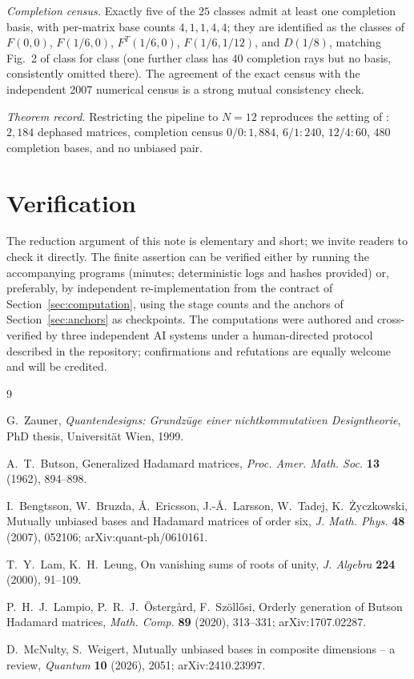 \documentclass[11pt]{article}
\theoremstyle{remark}
\begin{document}
\emph{Completion census.} Exactly five of the $25$ classes admit at
least one completion basis, with per-matrix base counts $4, 1, 1, 4,
4$; they are identified as the classes of $F(0,0)$, $F(1/6, 0)$,
$F^{T}(1/6, 0)$, $F(1/6, 1/12)$, and $D(1/8)$, matching Fig.~2 of
\cite{bengtsson2007} class for class (one further class has $40$
completion rays but no basis, consistently omitted there). The
agreement of the exact census with the independent 2007 numerical
census is a strong mutual consistency check.

\emph{Theorem record.} Restricting the pipeline to $N = 12$ reproduces
the setting of \cite[Thm.~7.15]{mcnulty2026}: $2{,}184$ dephased
matrices, completion census $0/0: 1{,}884$, $6/1: 240$, $12/4: 60$,
$480$ completion bases, and no unbiased pair.

\section{Verification}

The reduction argument of this note is elementary and short; we invite
readers to check it directly. The finite assertion can be verified
either by running the accompanying programs (minutes; deterministic
logs and hashes provided) or, preferably, by independent
re-implementation from the contract of Section~\ref{sec:computation},
using the stage counts and the anchors of Section~\ref{sec:anchors} as
checkpoints. The computations were authored and cross-verified by three
independent AI systems under a human-directed protocol described in the
repository; confirmations and refutations are equally welcome and will
be credited.

\begin{thebibliography}{9}

 G.~Zauner, \emph{Quantendesigns: Grundz\"uge
einer nichtkommutativen Designtheorie}, PhD thesis, Universit\"at Wien,
1999.

 A.~T.~Butson, Generalized Hadamard matrices,
\emph{Proc. Amer. Math. Soc.} \textbf{13} (1962), 894--898.

 I.~Bengtsson, W.~Bruzda, {\AA}.~Ericsson,
J.-{\AA}.~Larsson, W.~Tadej, K.~\.Zyczkowski, Mutually unbiased bases
and Hadamard matrices of order six, \emph{J. Math. Phys.} \textbf{48}
(2007), 052106; arXiv:quant-ph/0610161.

 T.~Y.~Lam, K.~H.~Leung, On vanishing sums of
roots of unity, \emph{J. Algebra} \textbf{224} (2000), 91--109.

 P.~H.~J.~Lampio, P.~R.~J.~\"Osterg\aa rd,
F.~Sz\"oll\H osi, Orderly generation of Butson Hadamard matrices,
\emph{Math. Comp.} \textbf{89} (2020), 313--331; arXiv:1707.02287.

 D.~McNulty, S.~Weigert, Mutually unbiased bases
in composite dimensions -- a review, \emph{Quantum} \textbf{10} (2026),
2051; arXiv:2410.23997.

\end{thebibliography}
\end{document}
